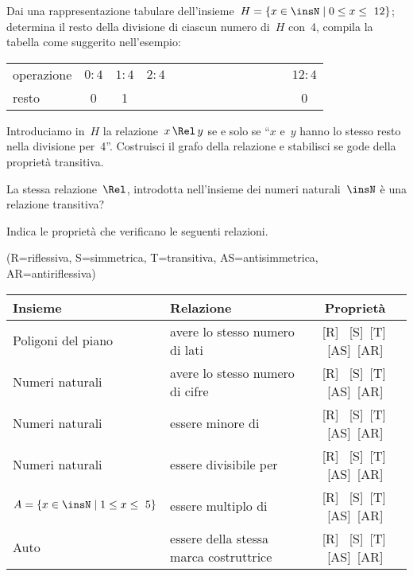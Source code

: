 \begin{esercizio}
\label{ese:\thechapter.24}
Dai una rappresentazione tabulare dell'insieme~$H = \{ x \in \insN \mid  0 \le x \le~12 \}$; determina il resto della divisione di ciascun numero di~$H$ con~4,
compila la tabella come suggerito nell'esempio:
\begin{center}
\begin{tabular}{lccccccccccccc}
\toprule
operazione & $0:4$ & $1:4$ & $2:4$ & & & & & & & & & & $12:4$ \\
resto & 0 & 1 & & & & & & & & & & & 0 \\
\bottomrule
\end{tabular}
\end{center}
Introduciamo in~$H$ la relazione~$x \,\Rel\, y$ se e solo se ``$x$ e~$y$ hanno lo stesso resto nella divisione per~4''.
Costruisci il grafo della relazione e stabilisci se gode della proprietà transitiva.

La stessa relazione~$\Rel$, introdotta nell'insieme dei numeri naturali~$\insN$ è una relazione transitiva?
\end{esercizio}

\begin{esercizio}
\label{ese:\thechapter.25}
Indica le proprietà che verificano le seguenti relazioni.
\begin{center}
(R=riflessiva, S=simmetrica, T=transitiva, AS=antisimmetrica, AR=antiriflessiva)

\begin{tabular}{llc}
\toprule
Insieme & Relazione & Proprietà\\
\midrule
Poligoni del piano & avere lo stesso numero di lati & [R] \, [S]\, [T]\, [AS]\, [AR] \\
Numeri naturali & avere lo stesso numero di cifre & [R] \, [S]\, [T]\, [AS]\, [AR] \\
Numeri naturali & essere minore di & [R] \, [S]\, [T]\, [AS]\, [AR] \\
Numeri naturali & essere divisibile per & [R] \, [S]\, [T]\, [AS]\, [AR] \\
$A = \{ x \in \insN \mid  1 \le x \le~5 \}$ & essere multiplo di & [R] \, [S]\, [T]\, [AS]\, [AR] \\
Auto & essere della stessa marca costruttrice & [R] \, [S]\, [T]\, [AS]\, [AR] \\
\bottomrule
\end{tabular}
\end{center}
\end{esercizio}

